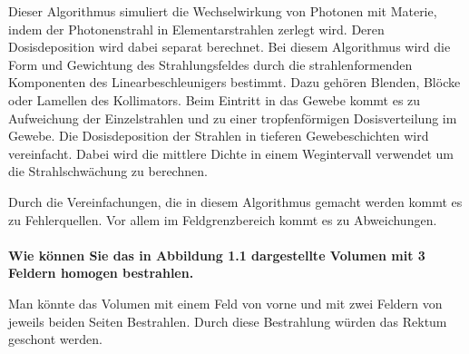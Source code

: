 Dieser Algorithmus simuliert die Wechselwirkung von Photonen mit Materie, indem der
Photonenstrahl in Elementarstrahlen zerlegt wird. Deren Dosisdeposition wird dabei
separat berechnet. Bei diesem Algorithmus wird die Form und Gewichtung des Strahlungsfeldes
durch die strahlenformenden Komponenten des Linearbeschleunigers bestimmt. Dazu gehören
Blenden, Blöcke oder Lamellen des Kollimators.
Beim Eintritt in das Gewebe kommt es zu Aufweichung der Einzelstrahlen und zu einer
tropfenförmigen Dosisverteilung im Gewebe.
Die Dosisdeposition der Strahlen in tieferen Gewebeschichten wird vereinfacht. Dabei wird
die mittlere Dichte in einem Wegintervall verwendet um die Strahlschwächung zu berechnen.

Durch die Vereinfachungen, die in diesem Algorithmus gemacht werden kommt es zu Fehlerquellen.
Vor allem im Feldgrenzbereich kommt es zu Abweichungen. \\\\

\textbf{Wie können Sie das in Abbildung 1.1 dargestellte Volumen mit 3 Feldern
homogen bestrahlen.}

Man könnte das Volumen mit einem Feld von vorne und mit zwei Feldern von jeweils beiden Seiten Bestrahlen.
Durch diese Bestrahlung würden das Rektum geschont werden. 
